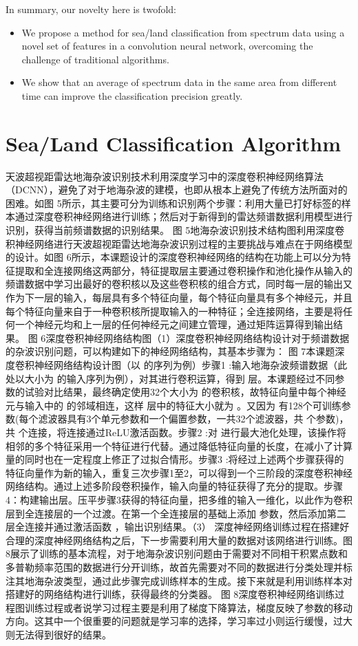 In summary, our novelty here is twofold:
\begin{itemize}
	\item We propose a method for sea/land classification from spectrum data using a novel set of features in a convolution neural network, overcoming the challenge of traditional algorithms.
	\item We show that an average of spectrum data in  the same area from different time can improve the classification precision greatly.
\end{itemize}

\section{Sea/Land Classification Algorithm}

天波超视距雷达地海杂波识别技术利用深度学习中的深度卷积神经网络算法（DCNN），避免了对于地海杂波的建模，也即从根本上避免了传统方法所面对的困难。如图 5所示，其主要可分为训练和识别两个步骤：利用大量已打好标签的样本通过深度卷积神经网络进行训练；然后对于新得到的雷达频谱数据利用模型进行识别，获得当前频谱数据的识别结果。 图 5地海杂波识别技术结构图利用深度卷积神经网络进行天波超视距雷达地海杂波识别过程的主要挑战与难点在于网络模型的设计。如图 6所示，本课题设计的深度卷积神经网络的结构在功能上可以分为特征提取和全连接网络这两部分，特征提取层主要通过卷积操作和池化操作从输入的频谱数据中学习出最好的卷积核以及这些卷积核的组合方式，同时每一层的输出又作为下一层的输入，每层具有多个特征向量，每个特征向量具有多个神经元，并且每个特征向量来自于一种卷积核所提取输入的一种特征；全连接网络，主要是将任何一个神经元均和上一层的任何神经元之间建立管理，通过矩阵运算得到输出结果。 图 6深度卷积神经网络结构图（1）深度卷积神经网络结构设计对于频谱数据的杂波识别问题，可以构建如下的神经网络结构，其基本步骤为： 图 7本课题深度卷积神经网络结构设计图（以 的序列为例）步骤1 :输入地海杂波频谱数据（此处以大小为 的输入序列为例），对其进行卷积运算，得到 层。本课题经过不同参数的试验对比结果，最终确定使用32个大小为 的卷积核，故特征向量中每个神经元与输入中的 的邻域相连，这样 层中的特征大小就为 。又因为 有128个可训练参数(每个滤波器具有3个单元参数和一个偏置参数，一共32个滤波器，共 个参数)，共 个连接，将连接通过ReLU激活函数。步骤2 :对 进行最大池化处理，该操作将相邻的多个特征采用一个特征进行代替。通过降低特征向量的长度，在减小了计算量的同时也在一定程度上修正了过拟合情形。步骤3 :将经过上述两个步骤获得的特征向量作为新的输入，重复三次步骤1至2，可以得到一个三阶段的深度卷积神经网络结构。通过上述多阶段卷积操作，输入向量的特征获得了充分的提取。步骤4：构建输出层。压平步骤3获得的特征向量，把多维的输入一维化，以此作为卷积层到全连接层的一个过渡。在第一个全连接层的基础上添加 参数，然后添加第二层全连接并通过激活函数 ，输出识别结果。（3）	深度神经网络训练过程在搭建好合理的深度神经网络结构之后，下一步需要利用大量的数据对该网络进行训练。图 8展示了训练的基本流程，对于地海杂波识别问题由于需要对不同相干积累点数和多普勒频率范围的数据进行分开训练，故首先需要对不同的数据进行分类处理并标注其地海杂波类型，通过此步骤完成训练样本的生成。接下来就是利用训练样本对搭建好的网络结构进行训练，获得最终的分类器。 图 8深度卷积神经网络训练过程图训练过程或者说学习过程主要是利用了梯度下降算法，梯度反映了参数的移动方向。这其中一个很重要的问题就是学习率的选择，学习率过小则运行缓慢，过大则无法得到很好的结果。

